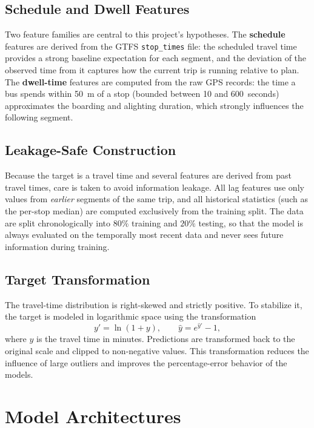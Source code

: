 \subsection{Schedule and Dwell Features}

Two feature families are central to this project's hypotheses. The \textbf{schedule} features are derived from the GTFS \texttt{stop\_times} file: the scheduled travel time provides a strong baseline expectation for each segment, and the deviation of the observed time from it captures how the current trip is running relative to plan. The \textbf{dwell-time} features are computed from the raw GPS records: the time a bus spends within 50~m of a stop (bounded between 10 and 600~seconds) approximates the boarding and alighting duration, which strongly influences the following segment.

\subsection{Leakage-Safe Construction}

Because the target is a travel time and several features are derived from past travel times, care is taken to avoid information leakage. All lag features use only values from \emph{earlier} segments of the same trip, and all historical statistics (such as the per-stop median) are computed exclusively from the training split. The data are split chronologically into $80\%$ training and $20\%$ testing, so that the model is always evaluated on the temporally most recent data and never sees future information during training.

\subsection{Target Transformation}

The travel-time distribution is right-skewed and strictly positive. To stabilize it, the target is modeled in logarithmic space using the transformation
\begin{equation}
y' = \ln(1 + y), \qquad \hat{y} = e^{\hat{y}'} - 1,
\end{equation}
where $y$ is the travel time in minutes. Predictions are transformed back to the original scale and clipped to non-negative values. This transformation reduces the influence of large outliers and improves the percentage-error behavior of the models.

\section{Model Architectures}

